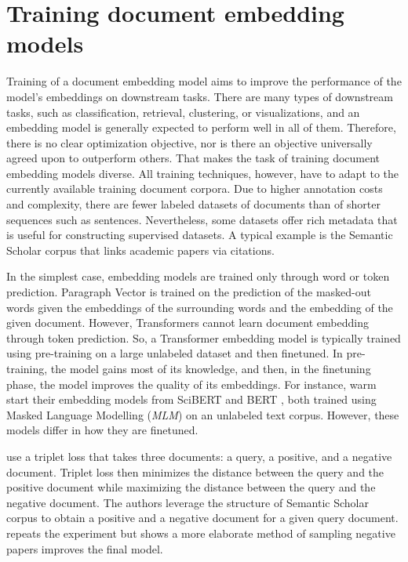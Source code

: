 \section{Training document embedding models}

Training of a document embedding model aims to improve the performance of
the model's embeddings on downstream tasks. There are many types of downstream
tasks, such as classification, retrieval, clustering, or visualizations, and an
embedding model is generally expected to perform well in all of them.
Therefore, there is no clear optimization objective, nor is there an objective
universally agreed upon to outperform others. That makes the task of training
document embedding models diverse. All training techniques, however, have to
adapt to the currently available training document corpora. Due to higher
annotation costs and complexity, there are fewer labeled datasets of
documents than of shorter sequences such as sentences.
Nevertheless, some datasets offer rich metadata that is useful for constructing
supervised datasets. A typical example is the Semantic Scholar
corpus \citep{ammar2018construction} that links academic papers via citations.

In the simplest case, embedding models are trained only through word or token
prediction. Paragraph Vector \citep{le2014distributed} is trained on the
prediction of the masked-out words given the embeddings of the surrounding
words and the embedding of the given document. However, Transformers cannot
learn document embedding through token prediction. So, a Transformer
embedding model is typically trained using pre-training on a large unlabeled dataset and then finetuned. In pre-training, the model gains most of its
knowledge, and then, in the finetuning phase, the model improves the quality
of its embeddings. For instance, \cite{cohan2020specter,
izacard2021unsupervised} warm start their embedding models from
SciBERT \citep{beltagy2019scibert} and BERT \citep{devlin2019bert}, both
trained using Masked Language Modelling (\emph{MLM}) on an unlabeled text
corpus. However, these models differ in how they are finetuned.

\cite{cohan2020specter} use a triplet loss that takes three documents: a query,
a positive, and a negative document. Triplet loss then minimizes the distance
between the query and the positive document while maximizing the distance
between the query and the negative document. The authors leverage the
structure of Semantic Scholar corpus \citep{ammar2018construction} to obtain a positive and a
negative document for a given query document.
\cite{ostendorff2022neighborhood} repeats the experiment but shows a more
elaborate method of sampling negative papers improves the final model.

